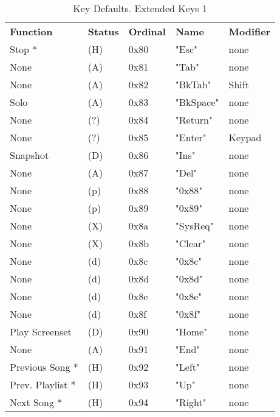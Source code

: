    \begin{table}[htb!]
      \centering
      \caption{Key Defaults. Extended Keys 1}
      \label{table:key_defaults_extended_keys_1}
      \begin{tabular}{l l l l l}
        \textbf{Function} & \textbf{Status} & \textbf{Ordinal} & \textbf{Name} & \textbf{Modifier} \\
        Stop *             & (H)  &  0x80   & "Esc"        & none \\
        None               & (A)  &  0x81   & "Tab"        & none \\
        None               & (A)  &  0x82   & "BkTab"      & Shift \\
        Solo               & (A)  &  0x83   & "BkSpace"    & none \\
        None               & (?)  &  0x84   & "Return"     & none \\
        None               & (?)  &  0x85   & "Enter"      & Keypad \\
        Snapshot           & (D)  &  0x86   & "Ins"        & none \\
        None               & (A)  &  0x87   & "Del"        & none \\
        None               & (p)  &  0x88   & "0x88"       & none \\
        None               & (p)  &  0x89   & "0x89"       & none \\
        None               & (X)  &  0x8a   & "SysReq"     & none \\
        None               & (X)  &  0x8b   & "Clear"      & none \\
        None               & (d)  &  0x8c   & "0x8c"       & none \\
        None               & (d)  &  0x8d   & "0x8d"       & none \\
        None               & (d)  &  0x8e   & "0x8e"       & none \\
        None               & (d)  &  0x8f   & "0x8f"       & none \\
        Play Screenset     & (D)  &  0x90   & "Home"       & none \\
        None               & (A)  &  0x91   & "End"        & none \\
        Previous Song *    & (H)  &  0x92   & "Left"       & none \\
        Prev. Playlist *   & (H)  &  0x93   & "Up"         & none \\
        Next Song *        & (H)  &  0x94   & "Right"      & none \\

\end{tabular}
\end{table}
